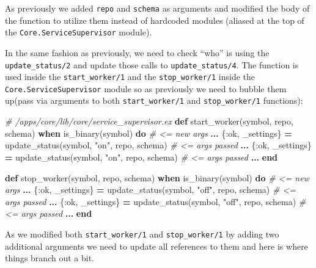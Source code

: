 \documentclass[
]{book}
\newenvironment{Shaded}{\begin{snugshade}}{\end{snugshade}}
\newcommand{\CommentTok}[1]{\textcolor[rgb]{0.56,0.35,0.01}{\textit{#1}}}
\newcommand{\KeywordTok}[1]{\textcolor[rgb]{0.13,0.29,0.53}{\textbf{#1}}}
\newcommand{\NormalTok}[1]{#1}
\newcommand{\OperatorTok}[1]{\textcolor[rgb]{0.81,0.36,0.00}{\textbf{#1}}}
\newcommand{\StringTok}[1]{\textcolor[rgb]{0.31,0.60,0.02}{#1}}
\newcommand{\VariableTok}[1]{\textcolor[rgb]{0.00,0.00,0.00}{#1}}
\begin{document}
As previously we added \texttt{repo} and \texttt{schema} as arguments and modified the body of the function to utilize them instead of hardcoded modules (aliased at the top of the \texttt{Core.ServiceSupervisor} module).

In the same fashion as previously, we need to check ``who'' is using the \texttt{update\_status/2} and update those calls to \texttt{update\_status/4}. The function is used inside the \texttt{start\_worker/1} and the \texttt{stop\_worker/1} inside the \texttt{Core.ServiceSupervisor} module so as previously we need to bubble them up(pass via arguments to both \texttt{start\_worker/1} and \texttt{stop\_worker/1} functions):

\begin{Shaded}
\begin{Highlighting}[]
  \CommentTok{\# /apps/core/lib/core/service\_supervisor.ex}
  \KeywordTok{def}\NormalTok{ start\_worker(symbol, repo, schema) }\KeywordTok{when}\NormalTok{ is\_binary(symbol) }\KeywordTok{do} \CommentTok{\# \textless{}= new args}
    \OperatorTok{...}
\NormalTok{        \{}\VariableTok{:ok}\NormalTok{, \_settings\} }\OperatorTok{=}\NormalTok{ update\_status(symbol, }\StringTok{"on"}\NormalTok{, repo, schema) }\CommentTok{\# \textless{}= args passed}
    \OperatorTok{...}
\NormalTok{        \{}\VariableTok{:ok}\NormalTok{, \_settings\} }\OperatorTok{=}\NormalTok{ update\_status(symbol, }\StringTok{"on"}\NormalTok{, repo, schema) }\CommentTok{\# \textless{}= args passed}
    \OperatorTok{...}
  \KeywordTok{end}

  \KeywordTok{def}\NormalTok{ stop\_worker(symbol, repo, schema) }\KeywordTok{when}\NormalTok{ is\_binary(symbol) }\KeywordTok{do} \CommentTok{\# \textless{}= new args}
    \OperatorTok{...}
\NormalTok{        \{}\VariableTok{:ok}\NormalTok{, \_settings\} }\OperatorTok{=}\NormalTok{ update\_status(symbol, }\StringTok{"off"}\NormalTok{, repo, schema) }\CommentTok{\# \textless{}= args passed}
    \OperatorTok{...}
\NormalTok{        \{}\VariableTok{:ok}\NormalTok{, \_settings\} }\OperatorTok{=}\NormalTok{ update\_status(symbol, }\StringTok{"off"}\NormalTok{, repo, schema) }\CommentTok{\# \textless{}= args passed}
    \OperatorTok{...}
  \KeywordTok{end}
\end{Highlighting}
\end{Shaded}

As we modified both \texttt{start\_worker/1} and \texttt{stop\_worker/1} by adding two additional arguments we need to update all references to them and here is where things branch out a bit.
\end{document}
